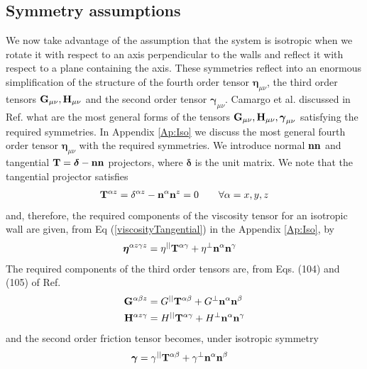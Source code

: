 \documentclass[b5paper,openright,11pt]{book}
\newcommand{\Pendiente}[1]{{\color{green}#1}} %
\begin{document}
\subsection{Symmetry assumptions}
We now take  advantage of the assumption that the  system is isotropic
when we rotate  it with respect to an axis  perpendicular to the walls
and reflect  it with respect  to a  plane containing the  axis.  These
symmetries reflect into an enormous simplification of the structure of
the fourth order tensor  $\boldsymbol{\eta}_{\mu\nu}$, the third order
tensors  ${\bf  G}_{\mu\nu},{\bf  H}_{\mu\nu}$ and  the  second  order
tensor  $\boldsymbol{\gamma}_{\mu\nu}$.   Camargo et al. discussed in
Ref. \cite{CamargoBC2018} what are  the most  general forms  of the
tensors                     ${\bf                     G}_{\mu\nu},{\bf
  H}_{\mu\nu},\boldsymbol{\gamma}_{\mu\nu}$  satisfying  the  required
symmetries.  In Appendix \ref{Ap:Iso} we discuss
the most general fourth order tensor $\boldsymbol{\eta}_{\mu\nu}$ with
the required  symmetries.  We  introduce normal  ${\bf n}{\bf  n}$ and
tangential  ${\bf T}=\boldsymbol{\delta}-{\bf  n}{\bf n}$  projectors, where $\boldsymbol{\delta}$ is the unit matrix. 
We note that the tangential projector satisfies
\begin{align}
{\bf  T}^{\alpha  z}=\delta^{\alpha z}-{\bf n}^\alpha{\bf n}^z=0\quad\quad \forall \alpha=x,y,z
\label{T3}
\end{align}
and, therefore, the required components of the viscosity tensor for an
isotropic wall  are given, from Eq  (\ref{viscosityTangential}) in the
Appendix \ref{Ap:Iso}, by
\begin{align}
  \boldsymbol{\eta}^{\alpha z\gamma z}&=  
\eta^{||} {\bf T}^{\alpha\gamma}+\eta^{\bot} {\bf n}^\alpha  {\bf n}^\gamma 
\label{etasimple}
\end{align}
The  required components  of the  third order
tensors are, from  Eqs. \Pendiente{(104) and (105)} of Ref. \cite{CamargoBC2018}
\begin{align}
{\bf G}^{\alpha\beta z}
&=G^{||}{\bf T}^{\alpha\beta}+
G^{\bot}{\bf n}^{\alpha}{\bf n}^{\beta}
\nonumber\\
{\bf H}^{\alpha z\gamma}
&=H^{||}{\bf T}^{\alpha\gamma}+
H^{\bot}{\bf n}^{\alpha}{\bf n}^{\gamma}
\label{GH}
\end{align}
and the second order friction tensor becomes, under
isotropic symmetry 
\begin{align}
\boldsymbol{\gamma}
&=\gamma^{||}{\bf T}^{\alpha\beta}+
\gamma^{\bot}{\bf n}^{\alpha}{\bf n}^{\beta}
\label{gg1}
\end{align}
\end{document}

